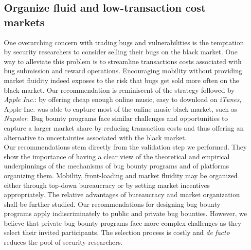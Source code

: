 \subsection{Organize fluid and low-transaction cost markets}
One overarching concern with trading bugs and vulnerabilities is the temptation by security researchers to consider selling their bugs on the black market. One way to alleviate this problem is to streamline transactions costs associated with bug submission and reward operations. Encouraging mobility without providing market fluidity indeed exposes to the risk that bugs get sold more often on the black market. Our recommendation is reminiscent of the strategy followed by {\it Apple Inc.}: by offering cheap enough online music, easy to download on {\it iTunes}, Apple Inc. was able to capture most of the online music black market, such as {\it Napster}. Bug bounty programs face similar challenges and opportunities to capture a larger market share by reducing transaction costs and thus offering an alternative to uncertainties associated with the black market.\\


Our recommendations stem directly from the validation step we performed. They show the importance of having a clear view of the theoretical and empirical underpinnings of the mechanisms of bug bounty programs and of platforms organizing them. Mobility, front-loading and market fluidity may be organized either through top-down bureaucracy or by setting market incentives appropriately. The relative advantages of bureaucracy and market organization shall be further studied. Our recommendations for designing bug bounty programs apply indiscriminately to public and private bug bounties. However, we believe that private bug bounty programs face more complex challenges as they select their invited participants. The selection process is costly and {\it de facto} reduces the pool of security researchers.\\



